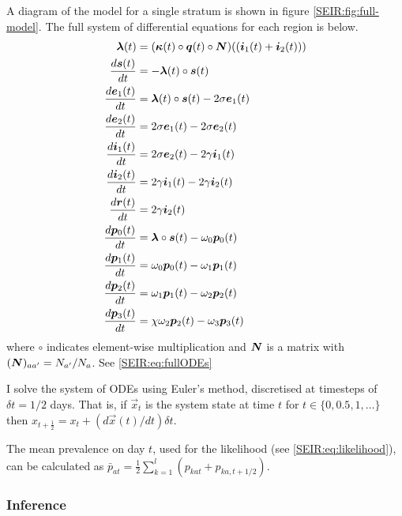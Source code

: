 \documentclass[thesis.tex]{subfiles}
\begin{document}
A diagram of the model for a single stratum is shown in figure \cref{SEIR:fig:full-model}.
The full system of differential equations for each region is below.
\begin{equation}
\begin{aligned}
    \bm{\lambda}(t) &= (\bm{\kappa}(t) \circ \bm{q}(t) \circ \bm{N}) ((\bm{i}_1(t) + \bm{i}_2(t))) \\
    \frac{d\bm{s}(t)}{dt} &= -\bm{\lambda}(t) \circ \bm{s}(t) \\
    \frac{d\bm{e}_1(t)}{dt} &= \bm{\lambda}(t) \circ \bm{s}(t) - 2\sigma \bm{e}_1(t) \\
    \frac{d\bm{e}_2(t)}{dt} &= 2\sigma \bm{e}_1(t) - 2\sigma \bm{e}_2(t) \\
    \frac{d\bm{i}_1(t)}{dt} &= 2\sigma \bm{e}_2(t) - 2\gamma \bm{i}_1(t) \\
    \frac{d\bm{i}_2(t)}{dt} &= 2\gamma \bm{i}_1(t) - 2\gamma \bm{i}_2(t) \\
    \frac{d\bm{r}(t)}{dt} &= 2\gamma \bm{i}_2(t) \\
    \frac{d\bm{p}_0(t)}{dt} &= \bm{\lambda} \circ \bm{s}(t) - \omega_0 \bm{p}_0(t) \\
    \frac{d\bm{p}_1(t)}{dt} &= \omega_0 \bm{p}_0(t) - \omega_1 \bm{p}_1(t) \\
    \frac{d\bm{p}_2(t)}{dt} &= \omega_1 \bm{p}_1(t) - \omega_{2} \bm{p}_2(t) \\
    \frac{d\bm{p}_3(t)}{dt} &= \chi \omega_{2} \bm{p}_2(t) - \omega_{3} \bm{p}_3(t)
\end{aligned}
\label{SEIR:eq:fullODEs}
\end{equation}
where $\circ$ indicates element-wise multiplication and $\bm{N}$ is a matrix with $(\bm{N})_{aa'} = N_{a'} / N_{a}$.
See \cref{SEIR:eq:fullODEs}

I solve the system of ODEs using Euler's method, discretised at timesteps of $\delta t = 1/2$ days.
That is, if $\vec{x}_t$ is the system state at time $t$ for $t \in \{ 0, 0.5, 1, \dots \}$ then $x_{t+\frac{1}{2}} = x_t + (d\vec{x}(t)/dt) \delta t$.

The mean prevalence on day $t$, used for the likelihood (see \cref{SEIR:eq:likelihood}), can be calculated as $\bar{p}_{at} = \frac{1}{2} \sum_{k=1}^l ( p_{kat} + p_{ka,t+1/2} )$.

\subsubsection{Inference} \label{SEIR:sec:inference}
\end{document}
